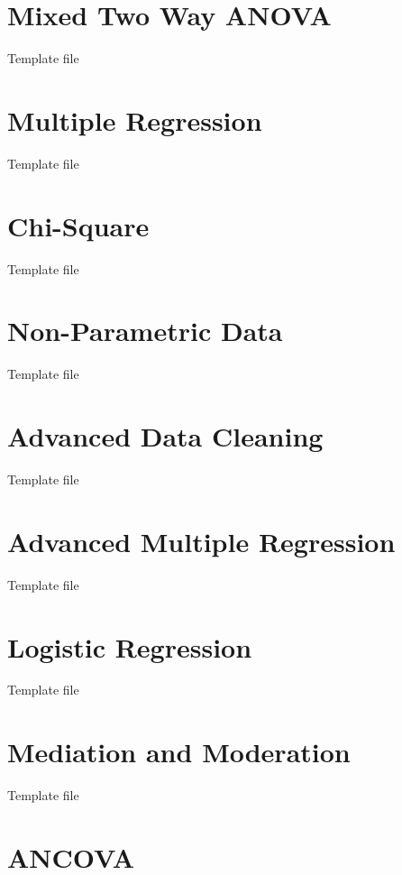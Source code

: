 \documentclass[]{book}
\theoremstyle{definition}
\theoremstyle{definition}
\theoremstyle{definition}
\theoremstyle{remark}
\begin{document}
{\chapter{Mixed Two Way ANOVA}\label{mixed-two-way-anova}

Template file

\chapter{Multiple Regression}\label{multiple-regression}

Template file

\chapter{Chi-Square}\label{chi-square}

Template file

\chapter{Non-Parametric Data}\label{non-parametric-data}

Template file

\chapter{Advanced Data Cleaning}\label{advanced-data-cleaning}

Template file

\chapter{Advanced Multiple
Regression}\label{advanced-multiple-regression}

Template file

\chapter{Logistic Regression}\label{logistic-regression}

Template file

\chapter{Mediation and Moderation}\label{mediation-and-moderation}

Template file

\chapter{ANCOVA}\label{ancova}

}
\end{document}

